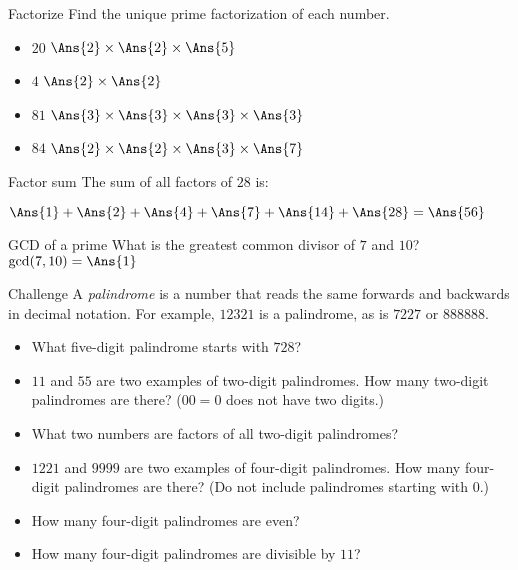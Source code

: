 \documentclass[12pt,letterpaper]{article}
\begin{document}
\pagebreak

\begin{problem}{Factorize}
 Find the unique prime factorization of each number.

 \begin{itemize}
  \item $20$ \hfill $\Ans{2} \times \Ans{2} \times \Ans{5}$
  \item $4$ \hfill $\Ans{2} \times \Ans{2}$
  \item $81$ \hfill $\Ans{3} \times \Ans{3} \times \Ans{3} \times \Ans{3}$
  \item $84$ \hfill $\Ans{2} \times \Ans{2} \times \Ans{3} \times \Ans{7}$
 \end{itemize}
\end{problem}

\begin{problem}{Factor sum}
 The sum of all factors of $28$ is:

 $\Ans{1} +
 \Ans{2} +
 \Ans{4} +
 \Ans{7} +
 \Ans{14} +
 \Ans{28} = \Ans{56}$
\end{problem}

\begin{problem}{GCD of a prime}
 What is the greatest common divisor of $7$ and $10$? \hfill
 $\gcd(7, 10) = \Ans{1}$
\end{problem}

\begin{problem}{Challenge}
 A \emph{palindrome} is a number that reads the same forwards and backwards in
 decimal notation. For example, $12321$ is a palindrome, as is $7227$ or
 $888888$.

 \begin{itemize}
  \item What five-digit palindrome starts with $728$? 
  \item $11$ and $55$ are two examples of two-digit palindromes.
  How many two-digit palindromes are there? ($00=0$ does not have two digits.)
  \item What two numbers are factors of all two-digit palindromes? 
  \item $1221$ and $9999$ are two examples of four-digit palindromes. How many
  four-digit palindromes are there? (Do not include palindromes starting with
  $0$.) 
  \item How many four-digit palindromes are even? 
  \item How many four-digit palindromes are divisible by $11$? 
 \end{itemize}
\end{problem}
\end{document}
